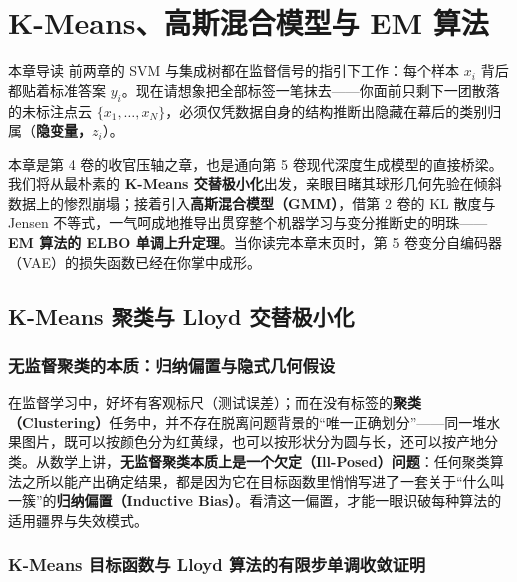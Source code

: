 \chapter[K-Means、高斯混合与 EM 算法]{K-Means、高斯混合模型与 EM 算法}\label{ch:em}

\begin{chapIntro}{本章导读}
前两章的 SVM 与集成树都在监督信号的指引下工作：每个样本 $x_i$ 背后都贴着标准答案 $y_i$。现在请想象把全部标签一笔抹去——你面前只剩下一团散落的未标注点云 $\{x_1, \dots, x_N\}$，必须仅凭数据自身的结构推断出隐藏在幕后的类别归属（\textbf{隐变量，$z_i$}）。

本章是第 4 卷的收官压轴之章，也是通向第 5 卷现代深度生成模型的直接桥梁。我们将从最朴素的 \textbf{K-Means 交替极小化}出发，亲眼目睹其球形几何先验在倾斜数据上的惨烈崩塌；接着引入\textbf{高斯混合模型（GMM）}，借第 2 卷的 KL 散度与 Jensen 不等式，一气呵成地推导出贯穿整个机器学习与变分推断史的明珠——\textbf{EM 算法的 ELBO 单调上升定理}。当你读完本章末页时，第 5 卷变分自编码器（VAE）的损失函数已经在你掌中成形。
\end{chapIntro}

\section{K-Means 聚类与 Lloyd 交替极小化}\label{sec:em-kmeans}

\subsection{无监督聚类的本质：归纳偏置与隐式几何假设}

在监督学习中，好坏有客观标尺（测试误差）；而在没有标签的\textbf{聚类（Clustering）}任务中，并不存在脱离问题背景的“唯一正确划分”——同一堆水果图片，既可以按颜色分为红黄绿，也可以按形状分为圆与长，还可以按产地分类。从数学上讲，\textbf{无监督聚类本质上是一个欠定（Ill-Posed）问题}：任何聚类算法之所以能产出确定结果，都是因为它在目标函数里悄悄写进了一套关于“什么叫一簇”的\textbf{归纳偏置（Inductive Bias）}。看清这一偏置，才能一眼识破每种算法的适用疆界与失效模式。

\subsection{K-Means 目标函数与 Lloyd 算法的有限步单调收敛证明}

